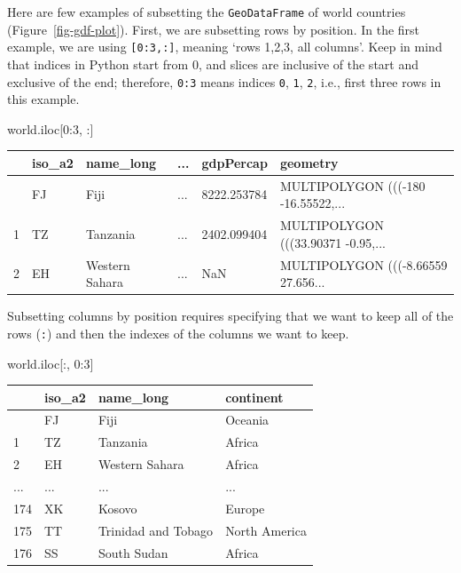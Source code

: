 \documentclass[
  letterpaper,
]{krantz}
\newenvironment{Shaded}{\begin{snugshade}}{\end{snugshade}}
\newcommand{\DecValTok}[1]{\textcolor[rgb]{0.68,0.00,0.00}{#1}}
\newcommand{\NormalTok}[1]{\textcolor[rgb]{0.00,0.23,0.31}{#1}}
\begin{document}
Here are few examples of subsetting the \texttt{GeoDataFrame} of world
countries (Figure~\ref{fig-gdf-plot}). First, we are subsetting rows by
position. In the first example, we are using \texttt{{[}0:3,:{]}},
meaning `rows 1,2,3, all columns'. Keep in mind that indices in Python
start from 0, and slices are inclusive of the start and exclusive of the
end; therefore, \texttt{0:3} means indices \texttt{0}, \texttt{1},
\texttt{2}, i.e., first three rows in this example.

\begin{Shaded}
\begin{Highlighting}[]
\NormalTok{world.iloc[}\DecValTok{0}\NormalTok{:}\DecValTok{3}\NormalTok{, :]}
\end{Highlighting}
\end{Shaded}

\begin{longtable}[]{@{}llllll@{}}
\toprule\noalign{}
& iso\_a2 & name\_long & ... & gdpPercap & geometry \\
\midrule\noalign{}
\endhead
\bottomrule\noalign{}
\endlastfoot
0 & FJ & Fiji & ... & 8222.253784 & MULTIPOLYGON (((-180
-16.55522,... \\
1 & TZ & Tanzania & ... & 2402.099404 & MULTIPOLYGON (((33.90371
-0.95,... \\
2 & EH & Western Sahara & ... & NaN & MULTIPOLYGON (((-8.66559
27.656... \\
\end{longtable}

Subsetting columns by position requires specifying that we want to keep
all of the rows (\texttt{:}) and then the indexes of the columns we want
to keep.

\begin{Shaded}
\begin{Highlighting}[]
\NormalTok{world.iloc[:, }\DecValTok{0}\NormalTok{:}\DecValTok{3}\NormalTok{]}
\end{Highlighting}
\end{Shaded}

\begin{longtable}[]{@{}llll@{}}
\toprule\noalign{}
& iso\_a2 & name\_long & continent \\
\midrule\noalign{}
\endhead
\bottomrule\noalign{}
\endlastfoot
0 & FJ & Fiji & Oceania \\
1 & TZ & Tanzania & Africa \\
2 & EH & Western Sahara & Africa \\
... & ... & ... & ... \\
174 & XK & Kosovo & Europe \\
175 & TT & Trinidad and Tobago & North America \\
176 & SS & South Sudan & Africa \\
\end{longtable}
\end{document}
